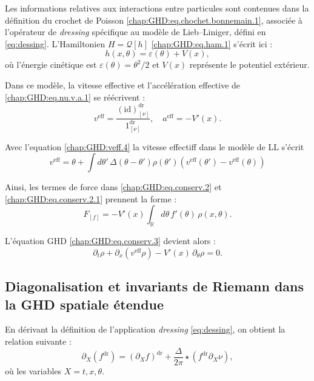Les informations relatives aux interactions entre particules sont contenues dans la définition du crochet de Poisson \eqref{chap:GHD:eq.chochet.bonnemain.1}, associée à l’opérateur de \emph{dressing} spécifique au modèle de Lieb–Liniger, défini en \eqref{eq:dessing}.  
L’Hamiltonien $H = \mathcal{Q}[h]$ \eqref{chap:GHD:eq.ham.1} s’écrit ici :
\begin{equation}\label{chap:GHD:eq.ham.2}
	h(x , \theta ) = \varepsilon(\theta) + V(x),
\end{equation}
où l’énergie cinétique est $\varepsilon(\theta) = \theta^2 / 2$ et $V(x)$ représente le potentiel extérieur.

\medskip

Dans ce modèle, la vitesse effective et l’accélération effective de \eqref{chap:GHD:eq.nu.v.a.1} se réécrivent :
\begin{equation}
	v^{\mathrm{eff}} = \frac{(\mathrm{id})^{\mathrm{dr}}_{[\nu]}}{1^{\mathrm{dr}}_{[\nu]}}, 
	\quad a^{\mathrm{eff}} = - V'(x).
\end{equation}

Avec l'equation \eqref{chap:GHD:veff.4} la vitesse effectiff dans le modèle de LL s'écrit 
\begin{equation}
	v^{\mathrm{eff}} = \theta +	\int d \theta' \, \Delta(\theta - \theta') \rho ( \theta') ( v^{\mathrm{eff}} ( \theta' ) - v^{\mathrm{eff}} ( \theta )  ) 
\end{equation}


Ainsi, les termes de force dans \eqref{chap:GHD:eq.conserv.2} et \eqref{chap:GHD:eq.conserv.2.1} prennent la forme :
\begin{equation}
	F_{[f]} = -V'(x) \int_{\mathbb{R}} d\theta \, f'(\theta) \, \rho(x, \theta).
\end{equation}

L’équation GHD \eqref{chap:GHD:eq.conserv.3} devient alors :
\begin{equation}\label{chap:GHD:eq.conserv.3.1}
	\partial_t \rho + \partial_x\!\left(v^{\mathrm{eff}} \rho\right) - V'(x) \, \partial_\theta \rho = 0.
\end{equation}


\subsection{Diagonalisation et invariants de Riemann dans la GHD spatiale étendue}

En dérivant la définition de l'application \emph{dressing} \eqref{eq:dessing}, on obtient la relation suivante :
\begin{equation}\label{chap:GHD:d.dressing}
	\partial_X(f^{\mathrm{dr}}) = \left (\partial_X f \right )^{\mathrm{dr}} + \frac{\Delta}{2\pi} \star ( f^{\mathrm{dr}} \partial_X \nu ), 	
\end{equation}
où les variables \(X = t, x, \theta\).

